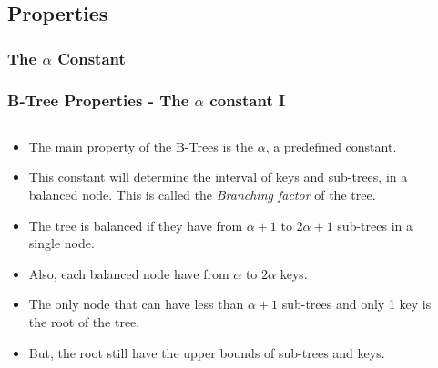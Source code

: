 \documentclass{beamer}
\begin{document}
\begin{frame}
    \subsection{Properties}
    \subsubsection{The \(\alpha\) Constant}
    \frametitle{B-Tree Properties - The \(\alpha\) constant I}
    \begin{columns}
        \begin{column}{\textlecolumn}
            \begin{block}{}
                \begin{itemize}
                    \item The main property of the B-Trees is the \(\alpha\), a predefined constant.
                    \item This constant will determine the interval of keys and sub-trees, in a balanced node. This is called the \emph{Branching factor} of the tree.
                    \item The tree is balanced if they have from \(\alpha + 1\) to \(2\alpha + 1\) sub-trees in a single node.
                    \item Also, each balanced node have from \(\alpha\) to \(2\alpha\) keys.
                    \item The only node that can have less than \(\alpha + 1\) sub-trees and only 1 key is the root of the tree. 
                    \item But, the root still have the upper bounds of sub-trees and keys.
                \end{itemize}
            \end{block}
        \end{column}
        \begin{column}{\textricolumn}
        \end{column}
    \end{columns}
\end{frame}
\end{document}
